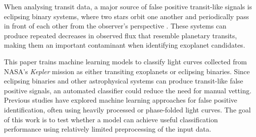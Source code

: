 When analysing transit data, a major source of false positive transit-like signals is eclipsing binary systems, where two stars orbit one another and periodically pass in front of each other from the observer's perspective \citep{2018ApJS..235...38T, Morton_2016}. These systems can produce repeated decreases in observed flux that resemble planetary transits, making them an important contaminant when identifying exoplanet candidates.

This paper trains machine learning models to classify light curves collected from NASA's \textit{Kepler} mission as either transiting exoplanets or eclipsing binaries. Since eclipsing binaries and other astrophysical systems can produce transit-like false positive signals, an automated classifier could reduce the need for manual vetting. Previous studies have explored machine learning approaches for false positive identification, often using heavily processed or phase-folded light curves. The goal of this work is to test whether a model can achieve useful classification performance using relatively limited preprocessing of the input data.

